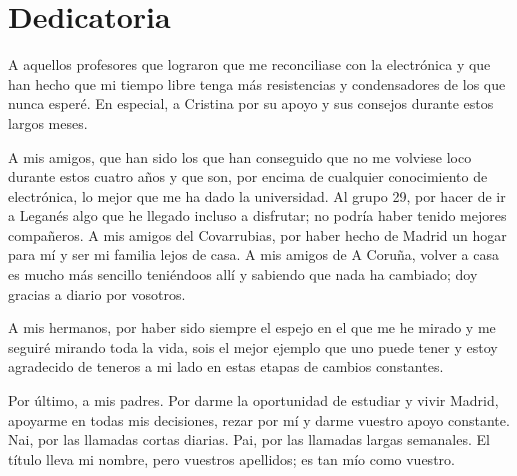 \documentclass[12pt]{report} %
\begin{document}
	\newpage %
	\thispagestyle{empty}
	\mbox{}


\chapter*{Dedicatoria} %

\setcounter{page}{6}
	
A aquellos profesores que lograron que me reconciliase con la electrónica y que han hecho que mi tiempo libre tenga más resistencias y condensadores de los que nunca esperé. En especial, a Cristina por su apoyo y sus consejos durante estos largos meses.  

A mis amigos, que han sido los que han conseguido que no me volviese loco durante estos cuatro años y que son, por encima de cualquier conocimiento de electrónica, lo mejor que me ha dado la universidad. 
Al grupo 29, por hacer de ir a Leganés algo que he llegado incluso a disfrutar; no podría haber tenido mejores compañeros. 
A mis amigos del Covarrubias, por haber hecho de Madrid un hogar para mí y ser mi familia lejos de casa. A mis amigos de A Coruña, volver a casa es mucho más sencillo teniéndoos allí y sabiendo que nada ha cambiado; doy gracias a diario por vosotros. 

A mis hermanos, por haber sido siempre el espejo en el que me he mirado y me seguiré mirando toda la vida, sois el mejor ejemplo que uno puede tener y estoy agradecido de teneros a mi lado en estas etapas de cambios constantes. 

Por último, a mis padres. Por darme la oportunidad de estudiar y vivir Madrid, apoyarme en todas mis decisiones, rezar por mí y darme vuestro apoyo constante. Nai, por las llamadas cortas diarias. Pai, por las llamadas largas semanales. El título lleva mi nombre, pero vuestros apellidos; es tan mío como vuestro. 
		
	\vfill
	
	\newpage %
	\thispagestyle{empty}
	\mbox{}
	


\tableofcontents
\thispagestyle{fancy}

\newpage %
\thispagestyle{empty}
\mbox{}
\end{document}
